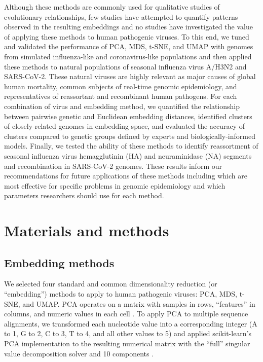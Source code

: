 \documentclass[10pt,letterpaper]{article}
\begin{document}
Although these methods are commonly used for qualitative studies of evolutionary relationships, few studies have attempted to quantify patterns observed in the resulting embeddings and no studies have investigated the value of applying these methods to human pathogenic viruses.
To this end, we tuned and validated the performance of PCA, MDS, t-SNE, and UMAP with genomes from simulated influenza-like and coronavirus-like populations and then applied these methods to natural populations of seasonal influenza virus A/H3N2 and SARS-CoV-2.
These natural viruses are highly relevant as major causes of global human mortality, common subjects of real-time genomic epidemiology, and representatives of reassortant and recombinant human pathogens.
For each combination of virus and embedding method, we quantified the relationship between pairwise genetic and Euclidean embedding distances, identified clusters of closely-related genomes in embedding space, and evaluated the accuracy of clusters compared to genetic groups defined by experts and biologically-informed models.
Finally, we tested the ability of these methods to identify reassortment of seasonal influenza virus hemagglutinin (HA) and neuraminidase (NA) segments and recombination in SARS-CoV-2 genomes.
These results inform our recommendations for future applications of these methods including which are most effective for specific problems in genomic epidemiology and which parameters researchers should use for each method.

\section*{Materials and methods}

\subsection*{Embedding methods}

We selected four standard and common dimensionality reduction (or ``embedding'') methods to apply to human pathogenic viruses: PCA, MDS, t-SNE, and UMAP.
PCA operates on a matrix with samples in rows, ``features'' in columns, and numeric values in each cell \cite{jolliffe_cadima_2016}.
To apply PCA to multiple sequence alignments, we transformed each nucleotide value into a corresponding integer (A to 1, G to 2, C to 3, T to 4, and all other values to 5) and applied scikit-learn's PCA implementation to the resulting numerical matrix with the ``full'' singular value decomposition solver and 10 components \cite{Pedregosa2011}.
\end{document}
